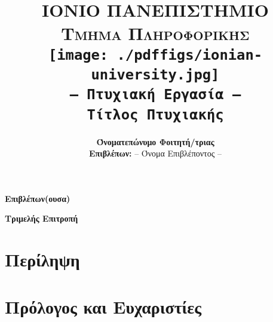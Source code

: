 \documentclass[a4paper,11pt,oneside,openany]{ioniothesis}
\begin{document}
\author{\textbf{Όνοματεπώνυμο Φοιτητή/τριας} \\ \textbf{Επιβλέπων:}  -- Όνομα Επιβλέποντος --}
\title{
\textbf{\LARGE{\textsc{ΙΟΝΙΟ ΠΑΝΕΠΙΣΤΗΜΙΟ}} 
\bigskip \\
\large{\textsc{Τμήμα Πληροφορικής}}
\bigskip \\ \bigskip \bigskip \bigskip
\bigskip \bigskip 
\texttt{[image: ./pdffigs/ionian-university.jpg]}
\bigskip \\ \bigskip 
\texttt{\large{-- Πτυχιακή Εργασία --}}
\bigskip \\ \bigskip
\textbf{\Large{\texttt{
Τίτλος Πτυχιακής
}}}
\bigskip \\ \bigskip}
}
\maketitle



\pagestyle{empty}
\cleardoublepage



\chapter*{}
\thispagestyle{empty}

\begin{center}
\Large{\textbf{Επιβλέπων(ουσα)}}
\end{center}

\begin{center}
\Large{\textbf{Τριμελής Επιτροπή}}
\end{center}





\pagestyle{empty}
\cleardoublepage


\cleardoublepage

  


\chapter*{Περίληψη} \pagestyle{headings}

\cleardoublepage

\chapter*{Πρόλογος και Ευχαριστίες} \pagestyle{headings}

\cleardoublepage
\end{document}
